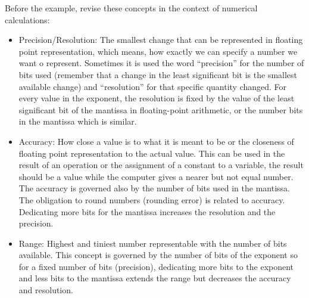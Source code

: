 \begin{IN}
    Before the example, revise these concepts in the context of numerical calculations:
    \begin{itemize}
        \item Precision/Resolution: The smallest change that can be represented in floating point representation, which means, how exactly we 
        can specify a number we want o represent. Sometimes it is used the word ``precision'' for the number of bits used (remember that a 
        change in the least significant bit is the smallest available change) and ``resolution'' for that specific quantity changed. For 
        every value in the exponent, the resolution is fixed by the value of the least significant bit of the mantissa in floating-point 
        arithmetic, or the number bits in the mantissa which is similar. 

        \item Accuracy: How close a value is to what it is meant to be or the closeness of floating point representation to the actual value. 
        This can be used in the result of an operation or the assignment of a constant to a variable, the result should be a value while the 
        computer gives a nearer but not equal number. The accuracy is governed also by the number of bits used in the mantissa. The 
        obligation to round numbers (rounding error) is related to accuracy. Dedicating more bits for the mantissa increases the resolution 
        and the precision.
        
        \item Range: Highest and tiniest number representable with the number of bits available. This concept is governed by the number of 
        bits of the exponent so for a fixed number of bits (precision), dedicating more bits to the exponent and less bits to the mantissa 
        extends the range but decreases the accuracy and resolution. 
    \end{itemize}
\end{IN}









